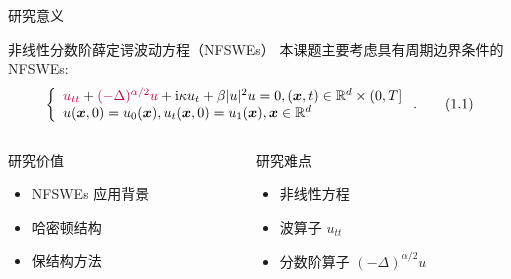 \documentclass[aspectratio=169]{beamer}
\numberwithin{theorem}{section} %
\numberwithin{equation}{section}%
\numberwithin{figure}{section}%
\numberwithin{table}{section}%
\begin{document}

\begin{frame}{研究意义}
	\begin{block}{非线性分数阶薛定谔波动方程（NFSWEs）}
		本课题主要考虑具有周期边界条件的 NFSWEs:
		\begin{equation}
			\left\{\begin{array}{l}
				\textcolor{purple}{u_{t t}}+\textcolor{purple}{(-\Delta)^{\alpha / 2} u}+\mathrm{i} \kappa u_t+\beta|u|^2 u=0,(\boldsymbol{x}, t) \in \mathbb{R}^d \times(0, T] \\
				u(\boldsymbol{x}, 0)=u_0(\boldsymbol{x}), u_t(\boldsymbol{x}, 0)=u_1(\boldsymbol{x}), \boldsymbol{x} \in \mathbb{R}^d
				\end{array}\right..\tag{1.1}
		\end{equation}
	  \end{block}

\begin{columns}
\begin{column}{0.45\textwidth}
	\begin{block}{研究价值}
	\begin{itemize}
		\setlength{\itemsep}{6pt}
		\item NFSWEs 应用背景
		\item 哈密顿结构
		\item 保结构方法
		\end{itemize}
	\end{block}
\end{column}
\begin{column}{0.45\textwidth}
	\begin{block}{研究难点}
	\begin{itemize}
		\setlength{\itemsep}{6pt}
		\item 非线性方程
		\item 波算子 $u_{tt} $
		\item 分数阶算子 $(-\Delta)^{\alpha / 2} u $
		\end{itemize}
	\end{block}
\end{column}
\end{columns}

\end{frame}
\end{document}
